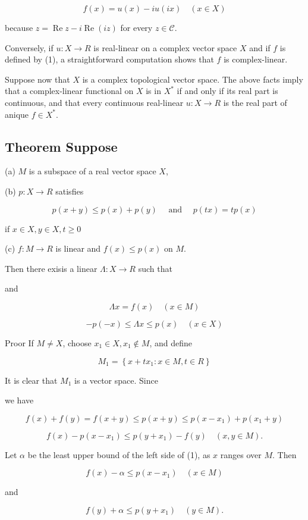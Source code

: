 \documentclass[10pt]{article}
\begin{document}
$$
f(x)=u(x)-i u(i x) \quad(x \in X)
$$

because $z=\operatorname{Re} z-i \operatorname{Re}(i z)$ for every $z \in \mathscr{C}$.

Conversely, if $u: X \rightarrow R$ is real-linear on a complex vector space $X$ and if $f$ is defined by (1), a straightforward computation shows that $f$ is complex-linear.

Suppose now that $X$ is a complex topological vector space. The above facts imply that a complex-linear functional on $X$ is in $X^{*}$ if and only if its real part is continuous, and that every continuous real-linear $u: X \rightarrow R$ is the real part of anique $f \in X^{*}$.

\subsection{Theorem Suppose}
(a) $M$ is a subspace of a real vector space $X$,

(b) $p: X \rightarrow R$ satisfies

$$
p(x+y) \leq p(x)+p(y) \quad \text { and } \quad p(t x)=t p(x)
$$

if $x \in X, y \in X, t \geq 0$

(c) $f: M \rightarrow R$ is linear and $f(x) \leq p(x)$ on $M$.

Then there exisis a linear $\Lambda: X \rightarrow R$ such that

and

$$
\Lambda x=f(x) \quad(x \in M)
$$

$$
-p(-x) \leq \Lambda x \leq p(x) \quad(x \in X)
$$

Proor If $M \neq X$, choose $x_{1} \in X, x_{1} \notin M$, and define

$$
M_{1}=\left\{x+t x_{1}: x \in M, t \in R\right\}
$$

It is clear that $M_{1}$ is a vector space. Since

we have

$$
f(x)+f(y)=f(x+y) \leq p(x+y) \leq p\left(x-x_{1}\right)+p\left(x_{1}+y\right)
$$

$$
f(x)-p\left(x-x_{1}\right) \leq p\left(y+x_{1}\right)-f(y) \quad(x, y \in M) .
$$

Let $\alpha$ be the least upper bound of the left side of (1), as $x$ ranges over $M$. Then

$$
f(x)-\alpha \leq p\left(x-x_{1}\right) \quad(x \in M)
$$

and

$$
f(y)+\alpha \leq p\left(y+x_{1}\right) \quad(y \in M) .
$$
\end{document}
